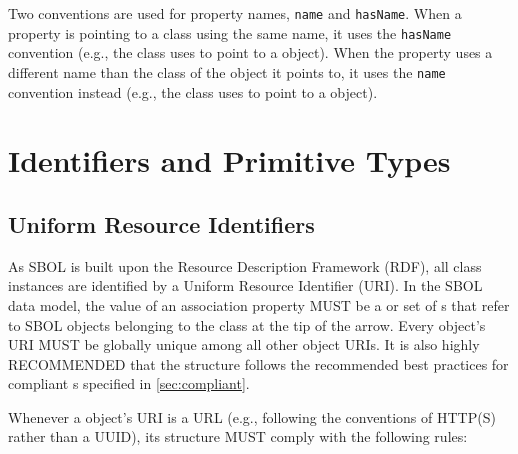 Two conventions are used for property names, {\tt name} and {\tt hasName}.  
When a property is pointing to a class using the same name, it uses the {\tt hasName} convention (e.g., the  class uses  to point to a  object).
When the property uses a different name than the class of the object it points to, it uses the {\tt name} convention instead (e.g., the  class uses  to point to a  object).


\section{Identifiers and Primitive Types}

\subsection{Uniform Resource Identifiers}
\label{sec:URIstructure}

As SBOL is built upon the Resource Description Framework (RDF), all class instances are identified by a Uniform Resource Identifier (URI).  In the SBOL data model, the value of an association property MUST be a  or set of s that refer to SBOL objects belonging to the class at the tip of the arrow.  Every  object's URI MUST be globally unique among all other  object URIs. It is also highly RECOMMENDED that the  structure follows the recommended best practices for compliant s specified in \ref{sec:compliant}.

Whenever a  object's URI is a URL (e.g., following the conventions of HTTP(S) rather than a UUID), its structure MUST comply with the following rules:

